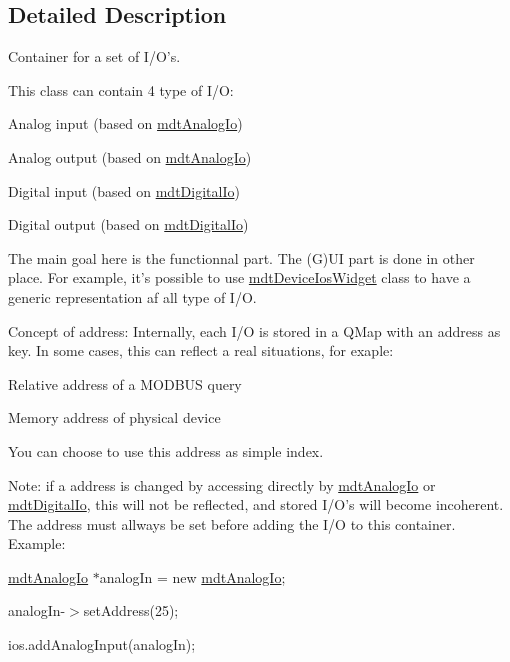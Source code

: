 \subsection{Detailed Description}
Container for a set of I/O's. 

This class can contain 4 type of I/O:
\begin{DoxyItemize}
\item Analog input (based on \hyperlink{classmdt_analog_io}{mdtAnalogIo})
\item Analog output (based on \hyperlink{classmdt_analog_io}{mdtAnalogIo})
\item Digital input (based on \hyperlink{classmdt_digital_io}{mdtDigitalIo})
\item Digital output (based on \hyperlink{classmdt_digital_io}{mdtDigitalIo})
\end{DoxyItemize}

The main goal here is the functionnal part. The (G)UI part is done in other place. For example, it's possible to use \hyperlink{classmdt_device_ios_widget}{mdtDeviceIosWidget} class to have a generic representation af all type of I/O.

Concept of address: Internally, each I/O is stored in a QMap with an address as key. In some cases, this can reflect a real situations, for exaple:
\begin{DoxyItemize}
\item Relative address of a MODBUS query
\item Memory address of physical device
\end{DoxyItemize}

You can choose to use this address as simple index.

Note: if a address is changed by accessing directly by \hyperlink{classmdt_analog_io}{mdtAnalogIo} or \hyperlink{classmdt_digital_io}{mdtDigitalIo}, this will not be reflected, and stored I/O's will become incoherent. The address must allways be set before adding the I/O to this container. Example:
\begin{DoxyItemize}
\item \hyperlink{classmdt_analog_io}{mdtAnalogIo} $\ast$analogIn = new \hyperlink{classmdt_analog_io}{mdtAnalogIo};
\item analogIn-\/$>$setAddress(25);
\item ios.addAnalogInput(analogIn);
\end{DoxyItemize}

